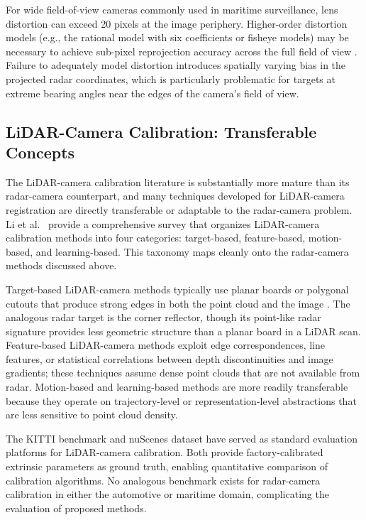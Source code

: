 For wide field-of-view cameras commonly used in maritime surveillance, lens distortion can exceed 20 pixels at the image periphery. Higher-order distortion models (e.g., the rational model with six coefficients or fisheye models) may be necessary to achieve sub-pixel reprojection accuracy across the full field of view \cite{zhang2000flexible}. Failure to adequately model distortion introduces spatially varying bias in the projected radar coordinates, which is particularly problematic for targets at extreme bearing angles near the edges of the camera's field of view.

\subsection{LiDAR-Camera Calibration: Transferable Concepts}\label{sec:lidar_camera}

The LiDAR-camera calibration literature is substantially more mature than its radar-camera counterpart, and many techniques developed for LiDAR-camera registration are directly transferable or adaptable to the radar-camera problem. Li et al.\ \cite{li2023targetless} provide a comprehensive survey that organizes LiDAR-camera calibration methods into four categories: target-based, feature-based, motion-based, and learning-based. This taxonomy maps cleanly onto the radar-camera methods discussed above.

Target-based LiDAR-camera methods typically use planar boards or polygonal cutouts that produce strong edges in both the point cloud and the image \cite{Geiger2012KITTI, zheng2021novel}. The analogous radar target is the corner reflector, though its point-like radar signature provides less geometric structure than a planar board in a LiDAR scan. Feature-based LiDAR-camera methods exploit edge correspondences, line features, or statistical correlations between depth discontinuities and image gradients; these techniques assume dense point clouds that are not available from radar. Motion-based and learning-based methods are more readily transferable because they operate on trajectory-level or representation-level abstractions that are less sensitive to point cloud density.

The KITTI benchmark \cite{Geiger2012KITTI} and nuScenes dataset \cite{Caesar2020nuScenes} have served as standard evaluation platforms for LiDAR-camera calibration. Both provide factory-calibrated extrinsic parameters as ground truth, enabling quantitative comparison of calibration algorithms. No analogous benchmark exists for radar-camera calibration in either the automotive or maritime domain, complicating the evaluation of proposed methods.

